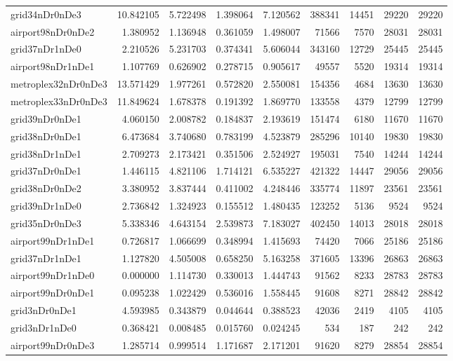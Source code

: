 \begin{longtable}{|l|r|r|r|r|r|r|r|r|}
grid34nDr0nDe3 & 10.842105 & 5.722498 & 1.398064 & 7.120562 & 388341 & 14451 & 29220 & 29220 \\
airport98nDr0nDe2 & 1.380952 & 1.136948 & 0.361059 & 1.498007 & 71566 & 7570 & 28031 & 28031 \\
grid37nDr1nDe0 & 2.210526 & 5.231703 & 0.374341 & 5.606044 & 343160 & 12729 & 25445 & 25445 \\
airport98nDr1nDe1 & 1.107769 & 0.626902 & 0.278715 & 0.905617 & 49557 & 5520 & 19314 & 19314 \\
metroplex32nDr0nDe3 & 13.571429 & 1.977261 & 0.572820 & 2.550081 & 154356 & 4684 & 13630 & 13630 \\
metroplex33nDr0nDe3 & 11.849624 & 1.678378 & 0.191392 & 1.869770 & 133558 & 4379 & 12799 & 12799 \\
grid39nDr0nDe1 & 4.060150 & 2.008782 & 0.184837 & 2.193619 & 151474 & 6180 & 11670 & 11670 \\
grid38nDr0nDe1 & 6.473684 & 3.740680 & 0.783199 & 4.523879 & 285296 & 10140 & 19830 & 19830 \\
grid38nDr1nDe1 & 2.709273 & 2.173421 & 0.351506 & 2.524927 & 195031 & 7540 & 14244 & 14244 \\
grid37nDr0nDe1 & 1.446115 & 4.821106 & 1.714121 & 6.535227 & 421322 & 14447 & 29056 & 29056 \\
grid38nDr0nDe2 & 3.380952 & 3.837444 & 0.411002 & 4.248446 & 335774 & 11897 & 23561 & 23561 \\
grid39nDr1nDe0 & 2.736842 & 1.324923 & 0.155512 & 1.480435 & 123252 & 5136 & 9524 & 9524 \\
grid35nDr0nDe3 & 5.338346 & 4.643154 & 2.539873 & 7.183027 & 402450 & 14013 & 28018 & 28018 \\
airport99nDr1nDe1 & 0.726817 & 1.066699 & 0.348994 & 1.415693 & 74420 & 7066 & 25186 & 25186 \\
grid37nDr1nDe1 & 1.127820 & 4.505008 & 0.658250 & 5.163258 & 371605 & 13396 & 26863 & 26863 \\
airport99nDr1nDe0 & 0.000000 & 1.114730 & 0.330013 & 1.444743 & 91562 & 8233 & 28783 & 28783 \\
airport99nDr0nDe1 & 0.095238 & 1.022429 & 0.536016 & 1.558445 & 91608 & 8271 & 28842 & 28842 \\
grid3nDr0nDe1 & 4.593985 & 0.343879 & 0.044644 & 0.388523 & 42036 & 2419 & 4105 & 4105 \\
grid3nDr1nDe0 & 0.368421 & 0.008485 & 0.015760 & 0.024245 & 534 & 187 & 242 & 242 \\
airport99nDr0nDe3 & 1.285714 & 0.999514 & 1.171687 & 2.171201 & 91620 & 8279 & 28854 & 28854 \\

\end{longtable}
